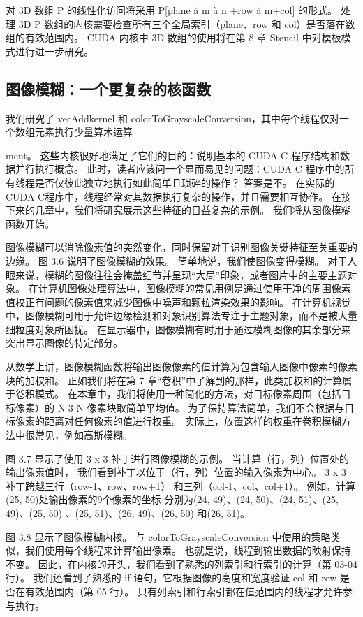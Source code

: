 对 3D 数组 P 的线性化访问将采用 P[plane à m à n +row à m+col] 的形式。 
处理 3D P 数组的内核需要检查所有三个全局索引（plane、row 和 col）是否落在数组的有效范围内。 
CUDA 内核中 3D 数组的使用将在第 8 章 Stencil 中对模板模式进行进一步研究。

\subsection{图像模糊：一个更复杂的核函数}
我们研究了 vecAddkernel 和 colorToGrayscaleConversion，其中每个线程仅对一个数组元素执行少量算术运算

ment。 这些内核很好地满足了它们的目的：说明基本的 CUDA C 程序结构和数据并行执行概念。 
此时，读者应该问一个显而易见的问题：CUDA C 程序中的所有线程是否仅彼此独立地执行如此简单且琐碎的操作？ 答案是不。 
在实际的CUDA C程序中，线程经常对其数据执行复杂的操作，并且需要相互协作。 
在接下来的几章中，我们将研究展示这些特征的日益复杂的示例。 我们将从图像模糊函数开始。

图像模糊可以消除像素值的突然变化，同时保留对于识别图像关键特征至关重要的边缘。 图 3.6 说明了图像模糊的效果。 
简单地说，我们使图像变得模糊。 对于人眼来说，模糊的图像往往会掩盖细节并呈现“大局”印象，或者图片中的主要主题对象。 
在计算机图像处理算法中，图像模糊的常见用例是通过使用干净的周围像素值校正有问题的像素值来减少图像中噪声和颗粒渲染效果的影响。 
在计算机视觉中，图像模糊可用于允许边缘检测和对象识别算法专注于主题对象，而不是被大量细粒度对象所困扰。 
在显示器中，图像模糊有时用于通过模糊图像的其余部分来突出显示图像的特定部分。

从数学上讲，图像模糊函数将输出图像像素的值计算为包含输入图像中像素的像素块的加权和。 
正如我们将在第 7 章“卷积”中了解到的那样，此类加权和的计算属于卷积模式。 
在本章中，我们将使用一种简化的方法，对目标像素周围（包括目标像素）的 N 3 N 像素块取简单平均值。 
为了保持算法简单，我们不会根据与目标像素的距离对任何像素的值进行权重。 
实际上，放置这样的权重在卷积模糊方法中很常见，例如高斯模糊。

图 3.7 显示了使用 3 x 3 补丁进行图像模糊的示例。 当计算（行，列）位置处的输出像素值时，
我们看到补丁以位于（行，列）位置的输入像素为中心。 3 x 3 补丁跨越三行（row-1、row、row+1）
和三列（col-1、col、col+1）。 例如，计算(25, 50)处输出像素的9个像素的坐标
分别为(24, 49)、(24, 50)、(24, 51)、(25, 49)、(25, 50) 、(25, 51)、(26, 49)、(26, 50) 和(26, 51)。

图 3.8 显示了图像模糊内核。 与 colorToGrayscaleConversion 中使用的策略类似，我们使用每个线程来计算输出像素。 
也就是说，线程到输出数据的映射保持不变。 因此，在内核的开头，我们看到了熟悉的列索引和行索引的计算（第 03-04 行）。 
我们还看到了熟悉的 if 语句，它根据图像的高度和宽度验证 col 和 row 是否在有效范围内（第 05 行）。 
只有列索引和行索引都在值范围内的线程才允许参与执行。

